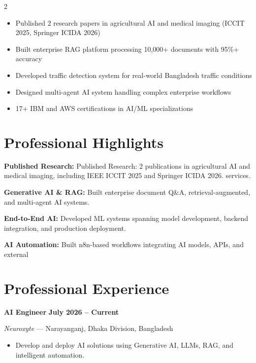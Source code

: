 \documentclass[10pt,a4paper]{article}
\newcommand{\job}[4]{
    \textbf{\large #1}
    \hfill
    \textbf{\small #4}

    \textit{#2} --- #3

    \vspace{1mm}
}
\begin{document}
\begin{multicols}{2}
\begin{itemize}
\item Published 2 research papers in agricultural AI and medical imaging (ICCIT 2025, Springer ICIDA 2026)
\item Built enterprise RAG platform processing 10,000+ documents with 95\%+ accuracy
\item Developed traffic detection system for real-world Bangladesh traffic conditions
\item Designed multi-agent AI system handling complex enterprise workflows
\item 17+ IBM and AWS certifications in AI/ML specializations
\end{itemize}
\newpage
\section{Professional Highlights}

\textbf{Published Research:} Published Research: 2 publications in agricultural AI and medical imaging, including IEEE ICCIT 2025 and Springer ICIDA 2026.
services.

\vspace{1mm}

\textbf{Generative AI \& RAG:} Built enterprise document Q\&A, retrieval-augmented, and multi-agent AI systems.

\vspace{1mm}

\textbf{End-to-End AI:} Developed ML systems spanning model development, backend integration, and production deployment.

\vspace{1mm}

\textbf{AI Automation:}  Built n8n-based workflows integrating AI models, APIs, and external 

\section{Professional Experience}

\job
{AI Engineer}
{Neuroxyte}
{Narayanganj, Dhaka Division, Bangladesh}
{July 2026 -- Current}

\begin{itemize}

\item Develop and deploy AI solutions using Generative AI, LLMs, RAG, and intelligent automation.


\end{itemize}
\end{multicols}
\end{document}
